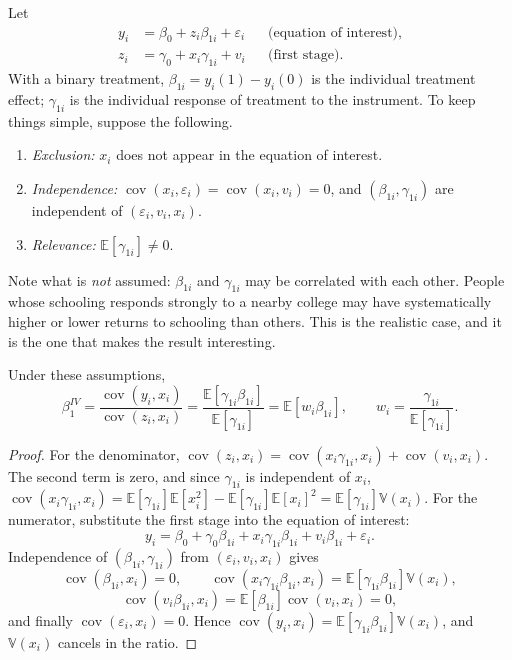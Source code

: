 \documentclass[11pt,a4paper]{article}
\newcommand{\E}{\mathbb{E}}
\newcommand{\V}{\mathbb{V}}
\newcommand{\Cov}{\operatorname{cov}}
\begin{document}
Let
\begin{align*}
y_i&=\beta_0+z_i\beta_{1i}+\varepsilon_i &&\text{(equation of interest)},\\
z_i&=\gamma_0+x_i\gamma_{1i}+v_i &&\text{(first stage)}.
\end{align*}
With a binary treatment, $\beta_{1i}=y_i(1)-y_i(0)$ is the individual treatment effect; $\gamma_{1i}$ is the individual response of treatment to the instrument. To keep things simple, suppose the following.

\begin{asmset}
\leavevmode
\begin{enumerate}[label=(\roman*)]
\item \emph{Exclusion:} $x_i$ does not appear in the equation of interest.
\item \emph{Independence:} $\Cov(x_i,\varepsilon_i)=\Cov(x_i,v_i)=0$, and $(\beta_{1i},\gamma_{1i})$ are independent of $(\varepsilon_i,v_i,x_i)$.
\item \emph{Relevance:} $\E[\gamma_{1i}]\neq0$.
\end{enumerate}
\end{asmset}

Note what is \emph{not} assumed: $\beta_{1i}$ and $\gamma_{1i}$ may be correlated with each other. People whose schooling responds strongly to a nearby college may have systematically higher or lower returns to schooling than others. This is the realistic case, and it is the one that makes the result interesting.

\begin{proposition}\label{prop:late}
Under these assumptions,
\[
\beta_1^{IV}=\frac{\Cov(y_i,x_i)}{\Cov(z_i,x_i)}=\frac{\E[\gamma_{1i}\beta_{1i}]}{\E[\gamma_{1i}]}=\E[w_i\beta_{1i}],\qquad w_i=\frac{\gamma_{1i}}{\E[\gamma_{1i}]} .
\]
\end{proposition}

\begin{proof}
For the denominator, $\Cov(z_i,x_i)=\Cov(x_i\gamma_{1i},x_i)+\Cov(v_i,x_i)$. The second term is zero, and since $\gamma_{1i}$ is independent of $x_i$, $\Cov(x_i\gamma_{1i},x_i)=\E[\gamma_{1i}]\E[x_i^2]-\E[\gamma_{1i}]\E[x_i]^2=\E[\gamma_{1i}]\V(x_i)$. For the numerator, substitute the first stage into the equation of interest:
\[
y_i=\beta_0+\gamma_0\beta_{1i}+x_i\gamma_{1i}\beta_{1i}+v_i\beta_{1i}+\varepsilon_i .
\]
Independence of $(\beta_{1i},\gamma_{1i})$ from $(\varepsilon_i,v_i,x_i)$ gives
\[
\Cov(\beta_{1i},x_i)=0,\qquad\Cov(x_i\gamma_{1i}\beta_{1i},x_i)=\E[\gamma_{1i}\beta_{1i}]\V(x_i),
\]
\[
\Cov(v_i\beta_{1i},x_i)=\E[\beta_{1i}]\Cov(v_i,x_i)=0,
\]
and finally $\Cov(\varepsilon_i,x_i)=0$. Hence $\Cov(y_i,x_i)=\E[\gamma_{1i}\beta_{1i}]\V(x_i)$, and $\V(x_i)$ cancels in the ratio.
\end{proof}
\end{document}
